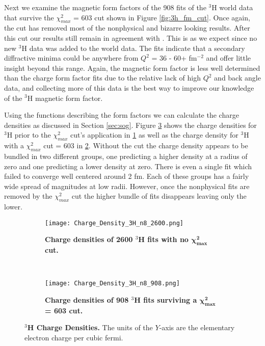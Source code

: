 Next we examine the magnetic form factors of the 908 fits of the $^3$H world data that survive the $\chi^2_{max}$ = 603 cut shown in Figure \ref{fig:3h_fm_cut}. Once again, the cut has removed most of the nonphysical and bizarre looking results. After this cut our results still remain in agreement with \cite{Article:Amroun}. This is as we expect since no new $^3$H data was added to the world data. The fits indicate that a secondary diffractive minima could be anywhere from $Q^2$ = 36 - 60+ fm$^{-2}$ and offer little insight beyond this range. Again, the magnetic form factor is less well determined than the charge form factor fits due to the relative lack of high $Q^2$ and back angle data, and collecting more of this data is the best way to improve our knowledge of the $^3$H magnetic form factor. 

Using the functions describing the form factors we can calculate the charge densities as discussed in Section \ref{sec:sog}. Figure \ref{fig:3h_charge_density} shows the charge densities for $^3$H prior to the $\chi^2_{max}$ cut's application in \ref{fig:3h_charge_density_no_cut} as well as the charge density for $^3$H with a $\chi^2_{max}$ cut = 603 in \ref{fig:3h_charge_density_cut}. Without the cut the charge density appears to be bundled in two different groups, one predicting a higher density at a radius of zero and one predicting a lower density at zero. There is even a single fit which failed to converge well centered around 2 fm. Each of these groups has a fairly wide spread of magnitudes at low radii. However, once the nonphysical fits are removed by the $\chi^2_{max}$ cut the higher bundle of fits disappears leaving only the lower. 

\begin{figure}[!ht]
\begin{subfigure}{1.\textwidth}
  \centering
  \texttt{[image: Charge\_Density\_3H\_n8\_2600.png]}
  \caption{\bf{Charge densities of 2600 $^3$H fits with no $\boldsymbol{\chi^2_{max}}$ cut.}}
  \label{fig:3h_charge_density_no_cut}
\end{subfigure}\\
\begin{subfigure}{1.\textwidth}
  \centering
  \texttt{[image: Charge\_Density\_3H\_n8\_908.png]}
  \caption{\bf{Charge densities of 908 $^3$H fits surviving a $\boldsymbol{\chi^2_{max}}$ = 603 cut.}}
  \label{fig:3h_charge_density_cut}
\end{subfigure}
\caption[$^3$H Charge Densities]{{\bf{$^3$H Charge Densities.}} The units of the $Y$-axis are the elementary electron charge per cubic fermi.}
\label{fig:3h_charge_density}
\end{figure}

